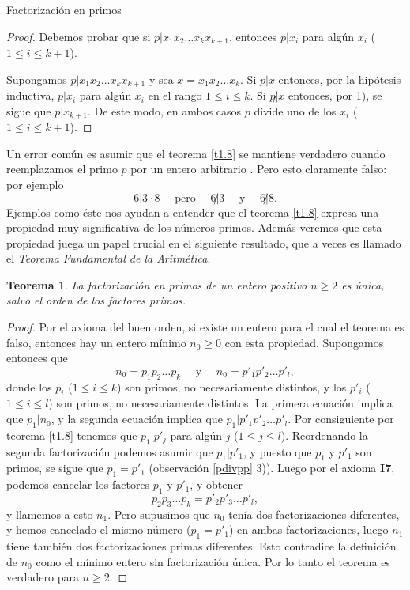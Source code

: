 \documentclass[11pt,spanish,makeidx]{amsbook}
\newtheorem{teorema}{Teorema}[section]
\theoremstyle{definition}
\theoremstyle{remark}
\begin{document}
\begin{section}{Factorización en primos}
\begin{proof}
Debemos probar que si $p|x_1x_2\ldots x_{k}x_{k+1}$, entonces  $p|x_i$ para algún $x_i$ ($1\le i \le k+1$).

Supongamos $p|x_1x_2\ldots x_{k}x_{k+1}$ y sea $x=x_1x_2\ldots x_k$. Si $p|x$ entonces, por la hipótesis inductiva, $p|x_i$ para algún $x_i$ en el rango $1\le i \le k$. Si $p{{\not|}}x$ entonces, por 1), se sigue que $p|x_{k+1}$. De este modo, en ambos casos $p$ divide uno de los $x_i$ ($1\le i\le k+1$). 
\end{proof}

Un error común es asumir que el teorema \ref{t1.8} se mantiene verdadero cuando reemplazamos el primo $p$ por un entero arbitrario . Pero esto claramente falso: por ejemplo
$$
6| 3\cdot 8 \quad \text{ pero } \quad 6{\not|} 3 \quad \text{ y }
\quad 6{\not|}8.
$$
Ejemplos como éste nos ayudan a entender que el teorema \ref{t1.8} expresa una propiedad muy significativa de los números primos. Además veremos que esta propiedad juega un papel crucial en el siguiente resultado, que a veces es llamado el {\it Teorema Fundamental de la Aritmética}.

\begin{teorema}\label{t1.8.2} La factorización en primos de un entero positivo $n\ge 2$ es única, salvo el orden de los factores primos.
\end{teorema}
\begin{proof} Por el axioma del buen orden, si existe un entero para el cual el teorema es falso, entonces hay un entero mínimo $n_0\ge 0$ con esta propiedad. Supongamos entonces que
$$
n_0= p_1p_2\ldots p_k\quad\text{ y }\quad n_0= p'_1p'_2\ldots p'_l,
$$
donde los $p_i$ ($1\le i \le k$) son primos, no necesariamente distintos, y los $p'_i$ ($1\le i \le l$) son primos, no necesariamente distintos. La primera ecuación implica que $p_1|n_0$, y la segunda ecuación implica que $p_1 | p'_1p'_2\ldots p'_l$. Por consiguiente por teorema \ref{t1.8} tenemos que $p_1|p'_j$ para algún $j$ ($1\le j \le l$). Reordenando la segunda factorización podemos asumir que $p_1 | p'_1$, y puesto que $p_1$ y $p'_1$ son primos, se sigue que $p_1=p'_1$ (observación \ref{pdivpp} 3)). Luego por el axioma {\bf I7}, podemos cancelar los factores $p_1$ y $p'_1$, y obtener
$$
p_2p_3 \ldots p_k = p'_2p'_3 \ldots p'_l,
$$
y llamemos a esto $n_1$. Pero supusimos que $n_0$ tenía dos factorizaciones diferentes, y hemos cancelado el mismo número ($p_1=p'_1$) en ambas factorizaciones, luego $n_1$ tiene también dos factorizaciones primas diferentes. Esto contradice la definición de $n_0$ como el mínimo entero sin factorización única. Por lo tanto el teorema es verdadero para $n\ge 2$.
\end{proof}


\end{section}
\end{document}
